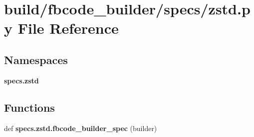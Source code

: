 \section{build/fbcode\+\_\+builder/specs/zstd.py File Reference}
\label{zstd_8py}
\subsection*{Namespaces}
\begin{DoxyCompactItemize}
\item 
 {\bf specs.\+zstd}
\end{DoxyCompactItemize}
\subsection*{Functions}
\begin{DoxyCompactItemize}
\item 
def {\bf specs.\+zstd.\+fbcode\+\_\+builder\+\_\+spec} (builder)
\end{DoxyCompactItemize}
